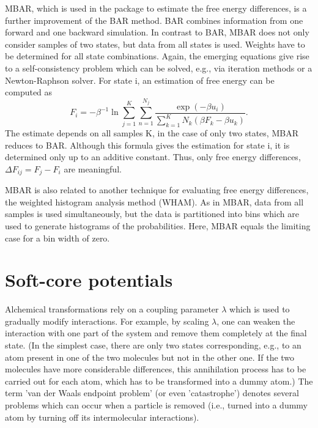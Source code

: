 MBAR, which is used in the {\trafo} package to estimate the free energy differences, is a further improvement of the BAR method. BAR combines information from one forward and one backward simulation.
In contrast to BAR, MBAR does not only consider samples of two states, but data from all states is used.
Weights have to be determined for all state combinations. Again, the emerging equations give rise to a self-consistency problem which can be solved, e.g., via iteration methods or a Newton-Raphson solver. For state i, an estimation of free energy can be computed as \begin{equation}F_{i}=-\beta^{-1}\ln\mathop{\sum}_{j=1}^{K}\sum_{n=1}^{N_{j}}\frac{\exp\left(-\beta u_{i}\right)}{\sum_{k=1}^{K}N_{k}\left(\beta F_{k}-\beta u_{k}\right)}.\end{equation} 
The estimate depends on all samples K, in the case of only two states, MBAR reduces to BAR. Although this formula gives the estimation for state i, it is determined only up to an additive constant. Thus, only free energy differences, $\Delta F_{ij}=F_{j}-F_{i}$ are meaningful. \cite{Shirts.2008} 

MBAR is also related to another technique for evaluating free energy differences, the weighted histogram analysis method (WHAM)\cite{Kumar.1992}. As in MBAR, data from all samples is used simultaneously, but the data is partitioned into bins which are used to generate histograms of the probabilities. Here, MBAR equals the limiting case for a bin width of zero.\cite{Shirts.2008, Klimovich.2015} 

\section{Soft-core potentials}

Alchemical transformations rely on a coupling parameter $\lambda$ which
is used to gradually modify interactions. For example, by scaling $\lambda$, one can weaken the interaction with one part of the system and remove them completely at the final state. (In the simplest case,
there are only two states corresponding, e.g., to an atom present in
one of the two molecules but not in the other one. If the two molecules
have more considerable differences, this annihilation process has to be carried out for each atom, which has to be transformed
into a dummy atom.)
The term 'van der Waals endpoint problem' (or even 'catastrophe') denotes
several problems which can occur when a particle is removed (i.e.,
turned into a dummy atom by turning off its intermolecular interactions).
\cite{Boresch.2011}

